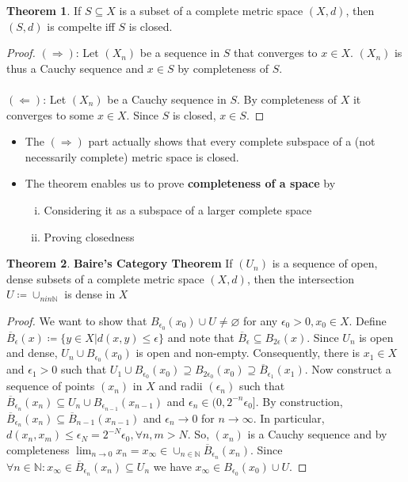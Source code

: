 \documentclass[10pt,a4paper]{article}
\theoremstyle{definition}
\theoremstyle{cor}
\theoremstyle{theorem}
\newtheorem{theorem}{Theorem}
\theoremstyle{lemma}
\theoremstyle{example}
\theoremstyle{remark}
\begin{document}
\begin{theorem}
If $S \subseteq X$ is a subset of a complete metric space $(X, d)$, then $(S, d)$ is compelte iff $S$ is closed.
\end{theorem}
\begin{proof}
$(\Rightarrow)$: Let $(X_n)$ be a sequence in $S$ that converges to $x\in X$. $(X_n)$ is thus a Cauchy sequence and $x\in S$ by completeness of $S$. \\ \\
$(\Leftarrow)$: Let $(X_n)$ be a Cauchy sequence in $S$. By completeness of $X$ it converges to some $x \in X$. Since $S$ is closed, $x \in S$. 
\end{proof}
\begin{itemize}
\item The $(\Rightarrow)$ part actually shows that every complete subspace of a (not necessarily complete) metric space is closed.
\item The theorem enables us to prove \textbf{completeness of a space} by 
\begin{enumerate}[(i)]
\item Considering it as a subspace of a larger complete space 
\item Proving closedness
\end{enumerate}
\end{itemize} 

\begin{theorem}
\textbf{Baire's Category Theorem} If $(U_n)$ is a sequence of open, dense subsets of a complete metric space $(X, d)$, then the intersection $U \coloneqq \cup_{n in \mathbb{N}}$ is dense in $X$
\end{theorem}
\begin{proof}
We want to show that $B_{\epsilon_0}(x_0) \cup U \neq \varnothing$ for any $\epsilon_0 > 0, x_0 \in X$. Define $\overline{B}_{\epsilon}(x) \coloneqq \{ y\in X|d(x,y)\leq \epsilon\}$ and note that $\overline{B}_{\epsilon} \subseteq B_{2\epsilon}(x)$. Since $U_n$ is open and dense, $U_n \cup B_{\epsilon_0}(x_0)$ is open and non-empty. Consequently, there is $x_1\in X$ and $\epsilon_1 > 0$ such that $U_1 \cup B_{\epsilon_0}(x_0) \supseteq B_{2\epsilon_0}(x_0) \supseteq \overline{B}_{\epsilon_1}(x_1)$. Now construct a sequence of points $(x_n)$ in $X$ and radii $(\epsilon_n)$ such that $\overline{B}_{\epsilon_n}(x_n) \subseteq U_n \cup B_{\epsilon_{n-1}}(x_{n-1})$ and $\epsilon_n \in (0, 2^{-n}\epsilon_0]$. By construction, $\overline{B}_{\epsilon_n}(x_n) \subseteq \overline{B}_{n-1}(x_{n-1})$ and $\epsilon_n \rightarrow 0$ for $n\rightarrow \infty$. In particular, $d(x_n, x_m)\leq \epsilon_N = 2^{-N}\epsilon_0, \forall n,m >N$. So, $(x_n)$ is a Cauchy sequence and by completeness $\lim_{n\rightarrow 0} x_n = x_{\infty} \in \cup_{n\in \mathbb{N}} \overline{B}_{\epsilon_n}(x_n)$. Since $\forall n \in \mathbb{N}: x_{\infty} \in \overline{B}_{\epsilon_n}(x_n)\subseteq U_n$ we have $x_{\infty} \in B_{\epsilon_0}(x_0) \cup U$.
\end{proof}
\end{document}
